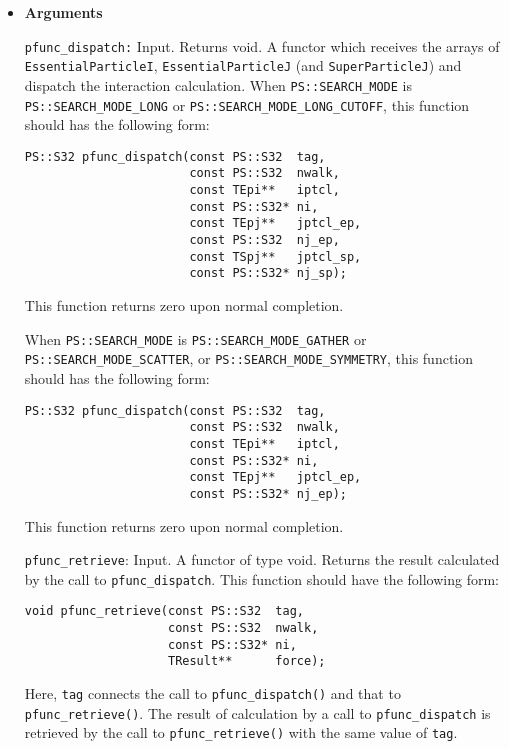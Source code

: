 \begin{itemize}

\item {\bf Arguments}

\texttt{pfunc\_dispatch:} Input. Returns void. A functor which receives the arrays of \newline \texttt{EssentialParticleI}, \texttt{EssentialParticleJ} (and \texttt{SuperParticleJ}) and dispatch the interaction calculation. When \texttt{PS::SEARCH\_MODE} is \texttt{PS::SEARCH\_MODE\_LONG} or \newline \texttt{PS::SEARCH\_MODE\_LONG\_CUTOFF}, this function should has the following form:

\begin{verbatim}
PS::S32 pfunc_dispatch(const PS::S32  tag,
                       const PS::S32  nwalk,
                       const TEpi**   iptcl,
                       const PS::S32* ni,
                       const TEpj**   jptcl_ep,
                       const PS::S32  nj_ep,
                       const TSpj**   jptcl_sp,
                       const PS::S32* nj_sp);
\end{verbatim}

This function returns zero upon normal completion.

When \texttt{PS::SEARCH\_MODE} is \texttt{PS::SEARCH\_MODE\_GATHER} or \texttt{PS::SEARCH\_MODE\_SCATTER}, or \texttt{PS::SEARCH\_MODE\_SYMMETRY},  this function should has the following form:


\begin{verbatim}
PS::S32 pfunc_dispatch(const PS::S32  tag,
                       const PS::S32  nwalk,
                       const TEpi**   iptcl,
                       const PS::S32* ni,
                       const TEpj**   jptcl_ep,
                       const PS::S32* nj_ep);
\end{verbatim}

This function returns zero upon normal completion.


\texttt{pfunc\_retrieve}: Input. A functor of type void. Returns the result calculated by the call to \texttt{pfunc\_dispatch}. This function should have the following form:

\begin{verbatim}
void pfunc_retrieve(const PS::S32  tag,
                    const PS::S32  nwalk,
                    const PS::S32* ni,
                    TResult**      force);
\end{verbatim}

Here, \texttt{tag} connects the call to \texttt{pfunc\_dispatch()} and that to \texttt{pfunc\_retrieve()}. The result of calculation by a call to \texttt{pfunc\_dispatch} is retrieved by the call to \texttt{pfunc\_retrieve()} with the same value of \texttt{tag}.


\end{itemize}
